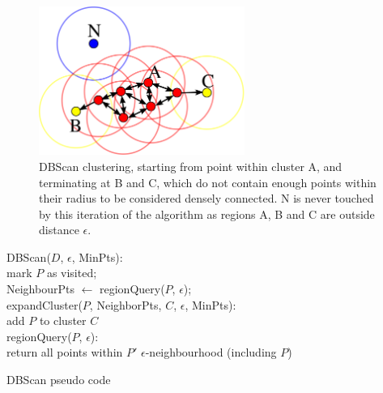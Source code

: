 \documentclass[]{article}
\begin{document}
{\begin{figure}[bt]
	\begin{center}
		\includegraphics[width=0.6\textwidth]{2000px-DBSCAN-Illustration.png}
	\end{center}
	\caption{DBScan clustering, starting from point within cluster A, and terminating at B and C, which do not contain enough points within their radius to be considered densely connected. N is never touched by this iteration of the algorithm as regions A, B and C are outside distance $\epsilon$.}
	\label{fig:dbscan}

\end{figure}

\begin{algorithm}[tb]
	\SetAlgoLined
	\bigskip
	DBScan($D$, $\epsilon$, MinPts): \\
	{
		mark $P$ as visited; \\
		NeighbourPts $\leftarrow$ regionQuery($P$, $\epsilon$); \\
	}
	\bigskip
	expandCluster($P$, NeighborPts, $C$, $\epsilon$, MinPts):  \\
	add $P$ to cluster $C$ \\
	\bigskip
	regionQuery($P$, $\epsilon$):  \\
	{
 		return all points within $P'$ $\epsilon$-neighbourhood (including $P$)
	}
	\bigskip
	\caption{DBScan pseudo code}
	\label{alg:dbscan}
\end{algorithm}

}
\end{document}
